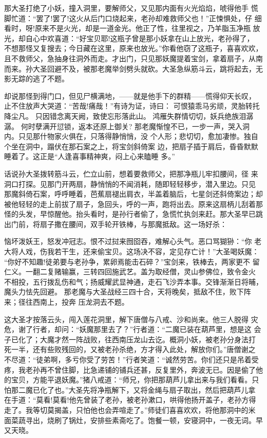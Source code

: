 那大圣打绝了小妖，撞入洞里，要解师父，又见那内面有火光焰焰，唬得他手
慌脚忙道：“罢了!罢了!这火从后门口烧起来，老孙却难救师父也！”正悚惧处，仔
细看时，呀!原来不是火光，却是一道金光。他正了性，往里视之，乃羊脂玉净瓶
放光，却自心中欢喜道：“好宝贝耶!这瓶子曾是那小妖拿在山上放光，老孙得了，
不想那怪又复搜去；今日藏在这里，原来也放光。”你看他窃了这瓶子，喜喜欢欢，
且不救师父，急抽身往洞外而走。才出门，只见那妖魔提着宝剑，拿着扇子，从南
而来。孙大圣回避不及，被那老魔举剑劈头就砍。大圣急纵筋斗云，跳将起去，无
影无踪的逃了不题。

却说那怪到得门口，但见尸横满地，——就是他手下的群精——慌得仰天长叹，
止不住放声大哭道：“苦哉!痛哉！”有诗为证，诗曰：
可恨猿乖马劣顽，灵胎转托降尘凡。
只因错念离天阙，致使忘形落此山。
鸿雁失群情切切，妖兵绝族泪潺潺。
何时孽满开愆锁，返本还原上御关?
那老魔惭惶不已，一步一声，哭入洞内。只见那什物家火俱在，只落得静悄悄，没
个人形；悲切切，愈加凄惨。独自个坐在洞中，蹋伏在那石案之上，将宝剑斜倚案
边，把扇子插于肩后，昏昏默默睡着了。这正是“人逢喜事精神爽，闷上心来瞌睡
多。”

话说孙大圣拨转筋斗云，伫立山前，想着要救师父，把那净瓶儿牢扣腰间，径
来洞口打探。见那门开两扇，静悄悄的不闻消耗，随即轻轻移步，潜入里边。只见
那魔斜倚石案，呼呼睡着，芭蕉扇褪出肩衣，半盖着脑后，七星剑还斜倚案边；却
被他轻轻的走上前拔了扇子，急回头，呼的一声，跑将出去。原来这扇柄儿刮着那
怪的头发，早惊醒他。抬头看时，是孙行者偷了，急慌忙执剑来赶。那大圣早已跳
出门前，将扇子撒在腰间，双手轮开铁棒，与那魔抵敌。这一场好杀：

恼坏泼妖王，怒发冲冠志。恨不过挝来囫囵吞，难解心头气。恶口骂猢狲：“你
老大将人戏，伤我若干生，还来偷宝贝。这场决不容，定见存亡计！”大圣喝妖魔：
“你好不知趣!徒弟要与老孙争，累卵焉能击石碎？”宝剑来，铁棒去，两家更不
留仁义。一翻二复赌输赢，三转四回施武艺。盖为取经僧，灵山参佛位，致令金火
不相投，五行拨乱伤和气；扬威耀武显神通，走石飞沙弄本事。交锋渐渐日将晡，
魔头力怯先回避。
那老魔与大圣战经三四十合，天将晚矣，抵敌不住，败下阵来；径往西南上，投奔
压龙洞去不题。

这大圣才按落云头，闯入莲花洞里，解下唐僧与八戒、沙和尚来。他三人脱得
灾危，谢了行者，却问：“妖魔那里去了？”行者道：“二魔已装在葫芦里，想是这
会子已化了；大魔才然一阵战败，往西南压龙山去讫。概洞小妖，被老孙分身法打
死一半，还有些败残回的，又被老孙杀绝，方才得入此处，解放你们。”唐僧谢之
不尽道：“徒弟啊，多亏你受了劳苦！”行者笑道：“诚然劳苦。你们还只是吊着受
疼，我老孙再不曾住脚，比急递铺的铺兵还甚，反复里外，奔波无已。因是偷了他
的宝贝，方能平退妖魔。”猪八戒道：“师兄，你把那葫芦儿拿出来与我们看看。只
怕那二魔已化了也。”大圣先将净瓶解下，又将金绳与扇子取出，然后把葫芦儿拿
在手道：“莫看!莫看!他先曾装了老孙，被老孙漱口，哄得他扬开盖子，老孙方得
走了。我等切莫揭盖，只怕他也会弄喧走了。”师徒们喜喜欢欢，将他那洞中的米
面菜蔬寻出，烧刷了锅灶，安排些素斋吃了。饱餐一顿，安寝洞中，一夜无词。早
又天晓。

